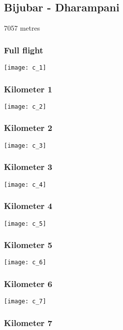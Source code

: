 \documentclass[]{article}
\begin{document}
\newpage

\subsection{Bijubar - Dharampani}\label{bijubar---dharampani}

7057 metres

\subsubsection{Full flight}\label{full-flight-2}

\texttt{[image: c\_1]}

\subsubsection{Kilometer 1}\label{kilometer-1-2}

\texttt{[image: c\_2]}

\subsubsection{Kilometer 2}\label{kilometer-2-2}

\texttt{[image: c\_3]}

\subsubsection{Kilometer 3}\label{kilometer-3-2}

\texttt{[image: c\_4]}

\subsubsection{Kilometer 4}\label{kilometer-4-2}

\texttt{[image: c\_5]}

\subsubsection{Kilometer 5}\label{kilometer-5-2}

\texttt{[image: c\_6]}

\subsubsection{Kilometer 6}\label{kilometer-6-2}

\texttt{[image: c\_7]}

\subsubsection{Kilometer 7}\label{kilometer-7-2}
\end{document}
